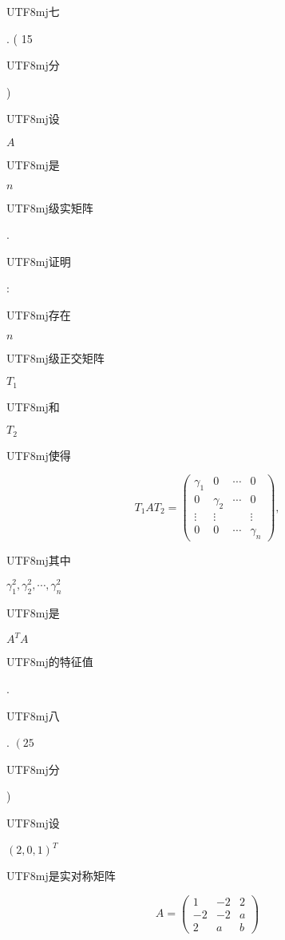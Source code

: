 \documentclass[10pt]{article}
\begin{document}
\begin{CJK}{UTF8}{mj}七\end{CJK}. ( 15 \begin{CJK}{UTF8}{mj}分\end{CJK}) \begin{CJK}{UTF8}{mj}设\end{CJK} $A$ \begin{CJK}{UTF8}{mj}是\end{CJK} $n$ \begin{CJK}{UTF8}{mj}级实矩阵\end{CJK}. \begin{CJK}{UTF8}{mj}证明\end{CJK}: \begin{CJK}{UTF8}{mj}存在\end{CJK} $n$ \begin{CJK}{UTF8}{mj}级正交矩阵\end{CJK} $T_{1}$ \begin{CJK}{UTF8}{mj}和\end{CJK} $T_{2}$ \begin{CJK}{UTF8}{mj}使得\end{CJK}
$$
T_{1} A T_{2}=\left(\begin{array}{cccc}
\gamma_{1} & 0 & \cdots & 0 \\
0 & \gamma_{2} & \cdots & 0 \\
\vdots & \vdots & & \vdots \\
0 & 0 & \cdots & \gamma_{n}
\end{array}\right),
$$
\begin{CJK}{UTF8}{mj}其中\end{CJK} $\gamma_{1}^{2}, \gamma_{2}^{2}, \cdots, \gamma_{n}^{2}$ \begin{CJK}{UTF8}{mj}是\end{CJK} $A^{T} A$ \begin{CJK}{UTF8}{mj}的特征值\end{CJK}. \begin{CJK}{UTF8}{mj}八\end{CJK}. $\left(25\right.$ \begin{CJK}{UTF8}{mj}分\end{CJK}) \begin{CJK}{UTF8}{mj}设\end{CJK} $(2,0,1)^{T}$ \begin{CJK}{UTF8}{mj}是实对称矩阵\end{CJK}
$$
A=\left(\begin{array}{ccc}
1 & -2 & 2 \\
-2 & -2 & a \\
2 & a & b
\end{array}\right)
$$
\end{document}

